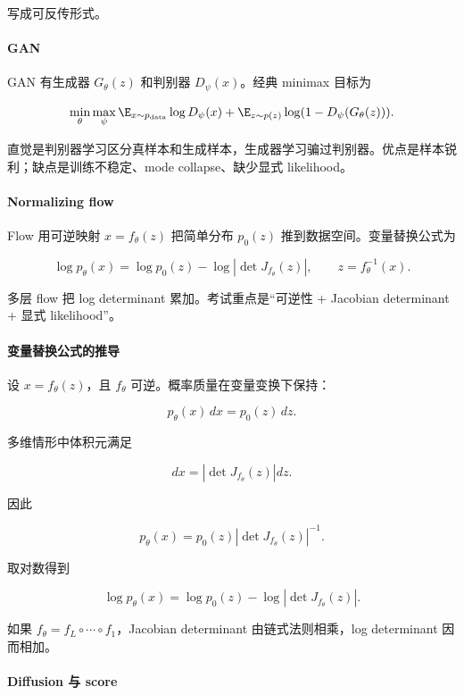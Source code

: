 写成可反传形式。

\paragraph{GAN}

GAN 有生成器 \(G_\theta(z)\) 和判别器 \(D_\psi(x)\)。经典 minimax 目标为

\[
  \min_\theta\max_\psi
  \E_{x\sim p_{\mathrm{data}}}\log D_\psi(x)
  +
  \E_{z\sim p(z)}
  \log(1-D_\psi(G_\theta(z))).
\]

直觉是判别器学习区分真样本和生成样本，生成器学习骗过判别器。优点是样本锐利；缺点是训练不稳定、mode collapse、缺少显式 likelihood。

\paragraph{Normalizing flow}


Flow 用可逆映射 \(x=f_\theta(z)\) 把简单分布 \(p_0(z)\) 推到数据空间。变量替换公式为

\[
  \log p_\theta(x)
  =
  \log p_0(z)
  -
  \log\left|\det J_{f_\theta}(z)\right|,
  \qquad
  z=f_\theta^{-1}(x).
\]

多层 flow 把 log determinant 累加。考试重点是“可逆性 + Jacobian determinant + 显式 likelihood”。

\paragraph{变量替换公式的推导}

设 \(x=f_\theta(z)\)，且 \(f_\theta\) 可逆。概率质量在变量变换下保持：

\[
  p_\theta(x)\,dx
  =
  p_0(z)\,dz.
\]

多维情形中体积元满足

\[
  dx
  =
  \left|\det J_{f_\theta}(z)\right|dz.
\]

因此

\[
  p_\theta(x)
  =
  p_0(z)
  \left|
    \det J_{f_\theta}(z)
  \right|^{-1}.
\]

取对数得到

\[
  \log p_\theta(x)
  =
  \log p_0(z)
  -
  \log\left|\det J_{f_\theta}(z)\right|.
\]

如果 \(f_\theta=f_L\circ\cdots\circ f_1\)，Jacobian determinant 由链式法则相乘，log determinant 因而相加。

\paragraph{Diffusion 与 score}

